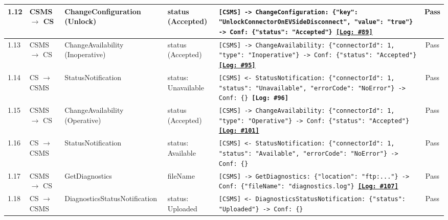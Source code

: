 \documentclass[10pt, a4paper, landscape]{article}
\begin{document}
\begin{longtable}{|p{1.0cm}|p{2.5cm}|p{4.0cm}|p{5.0cm}|p{10.0cm}|c|}
\hline
1.12 & CSMS $\to$ CS & ChangeConfiguration (Unlock) & status (Accepted) & \footnotesize\texttt{[CSMS] -> ChangeConfiguration: \{"key": "UnlockConnectorOnEVSideDisconnect", "value": "true"\} \newline [CS] -> Conf: \{"status": "Accepted"\} \newline \hyperref[log:1.12]{\textbf{[Log: \#89]}}} & Pass \\
\hline
1.13 & CSMS $\to$ CS & ChangeAvailability (Inoperative) & status (Accepted) & \footnotesize\texttt{[CSMS] -> ChangeAvailability: \{"connectorId": 1, "type": "Inoperative"\} \newline [CS] -> Conf: \{"status": "Accepted"\} \newline \hyperref[log:1.13]{\textbf{[Log: \#95]}}} & Pass \\
\hline
1.14 & CS $\to$ CSMS & StatusNotification & status: Unavailable & \footnotesize\texttt{[CSMS] <- StatusNotification: \{"connectorId": 1, "status": "Unavailable", "errorCode": "NoError"\} \newline [CSMS] -> Conf: \{\} \newline \textbf{[Log: \#96]}} & Pass \\
\hline
1.15 & CSMS $\to$ CS & ChangeAvailability (Operative) & status (Accepted) & \footnotesize\texttt{[CSMS] -> ChangeAvailability: \{"connectorId": 1, "type": "Operative"\} \newline [CS] -> Conf: \{"status": "Accepted"\} \newline \hyperref[log:1.15]{\textbf{[Log: \#101]}}} & Pass \\
\hline
1.16 & CS $\to$ CSMS & StatusNotification & status: Available & \footnotesize\texttt{[CSMS] <- StatusNotification: \{"connectorId": 1, "status": "Available", "errorCode": "NoError"\} \newline [CSMS] -> Conf: \{\}} & Pass \\
\hline
1.17 & CSMS $\to$ CS & GetDiagnostics & fileName & \footnotesize\texttt{[CSMS] -> GetDiagnostics: \{"location": "ftp:..."\} \newline [CS] -> Conf: \{"fileName": "diagnostics.log"\} \newline \hyperref[log:1.17]{\textbf{[Log: \#107]}}} & Pass \\
\hline
1.18 & CS $\to$ CSMS & DiagnosticsStatusNotification & status: Uploaded & \footnotesize\texttt{[CSMS] <- DiagnosticsStatusNotification: \{"status": "Uploaded"\} \newline [CSMS] -> Conf: \{\}} & Pass \\

\end{longtable}
\end{document}
